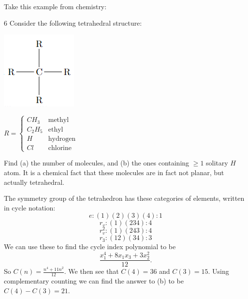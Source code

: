 Take this example from chemistry: 
\begin{example}6
    Consider the following tetrahedral structure:
    \begin{center}
        \includegraphics[scale=1]{figures/tetrahedron_chemistry.png}

        $R = \begin{cases} CH_3 & \text{methyl} \\ C_2H_5 & \text{ethyl} \\
            H & \text{hydrogen} \\ Cl & \text{chlorine} \end{cases}$ 
    \end{center}
    Find (a) the number of molecules, and (b) the ones containing $\geq 1$ 
    solitary $H$ atom. It is a chemical fact that these molecules are in 
    fact not planar, but actually tetrahedral. 

    The symmetry group of the tetrahedron has these categories of elements, 
    written in cycle notation: 
    $$ e : (1)(2)(3)(4) : 1$$
    $$ r_v : (1)(234) : 4$$
    $$ r_v^2 : (1)(243) : 4 $$
    $$ r_3 : (12)(34) : 3$$ 
    We can use these to find the cycle index polynomial to be 
    \[ \frac {x_1^4 + 8 x_1 x_3 + 3x_2^2}{12}.\]
    So $C(n) = \frac{n^4 + 11n^2}{12}$. We then see that $C(4) = 36$ and $C(3) = 15$. 
    Using complementary counting we can find the answer to (b) to be $C(4) - C(3) = 21$. 
\end{example}
